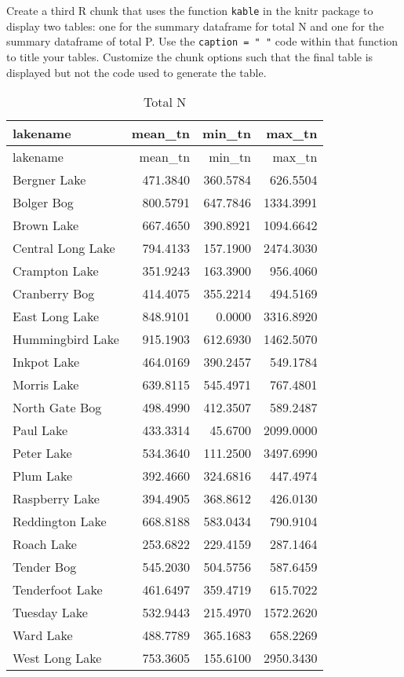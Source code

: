\documentclass[]{article}
\newenvironment{Shaded}{\begin{snugshade}}{\end{snugshade}}
\newcommand{\KeywordTok}[1]{\textcolor[rgb]{0.13,0.29,0.53}{\textbf{#1}}}
\newcommand{\DataTypeTok}[1]{\textcolor[rgb]{0.13,0.29,0.53}{#1}}
\newcommand{\StringTok}[1]{\textcolor[rgb]{0.31,0.60,0.02}{#1}}
\newcommand{\OperatorTok}[1]{\textcolor[rgb]{0.81,0.36,0.00}{\textbf{#1}}}
\newcommand{\NormalTok}[1]{#1}
\begin{document}
\begin{Shaded}
\end{Shaded}

Create a third R chunk that uses the function \texttt{kable} in the
knitr package to display two tables: one for the summary dataframe for
total N and one for the summary dataframe of total P. Use the
\texttt{caption\ =\ "\ "} code within that function to title your
tables. Customize the chunk options such that the final table is
displayed but not the code used to generate the table.

\begin{longtable}[]{@{}lrrr@{}}
\caption{Total N}\tabularnewline
\toprule
lakename & mean\_tn & min\_tn & max\_tn\tabularnewline
\midrule
\endfirsthead
\toprule
lakename & mean\_tn & min\_tn & max\_tn\tabularnewline
\midrule
\endhead
Bergner Lake & 471.3840 & 360.5784 & 626.5504\tabularnewline
Bolger Bog & 800.5791 & 647.7846 & 1334.3991\tabularnewline
Brown Lake & 667.4650 & 390.8921 & 1094.6642\tabularnewline
Central Long Lake & 794.4133 & 157.1900 & 2474.3030\tabularnewline
Crampton Lake & 351.9243 & 163.3900 & 956.4060\tabularnewline
Cranberry Bog & 414.4075 & 355.2214 & 494.5169\tabularnewline
East Long Lake & 848.9101 & 0.0000 & 3316.8920\tabularnewline
Hummingbird Lake & 915.1903 & 612.6930 & 1462.5070\tabularnewline
Inkpot Lake & 464.0169 & 390.2457 & 549.1784\tabularnewline
Morris Lake & 639.8115 & 545.4971 & 767.4801\tabularnewline
North Gate Bog & 498.4990 & 412.3507 & 589.2487\tabularnewline
Paul Lake & 433.3314 & 45.6700 & 2099.0000\tabularnewline
Peter Lake & 534.3640 & 111.2500 & 3497.6990\tabularnewline
Plum Lake & 392.4660 & 324.6816 & 447.4974\tabularnewline
Raspberry Lake & 394.4905 & 368.8612 & 426.0130\tabularnewline
Reddington Lake & 668.8188 & 583.0434 & 790.9104\tabularnewline
Roach Lake & 253.6822 & 229.4159 & 287.1464\tabularnewline
Tender Bog & 545.2030 & 504.5756 & 587.6459\tabularnewline
Tenderfoot Lake & 461.6497 & 359.4719 & 615.7022\tabularnewline
Tuesday Lake & 532.9443 & 215.4970 & 1572.2620\tabularnewline
Ward Lake & 488.7789 & 365.1683 & 658.2269\tabularnewline
West Long Lake & 753.3605 & 155.6100 & 2950.3430\tabularnewline
\bottomrule
\end{longtable}
\end{document}
